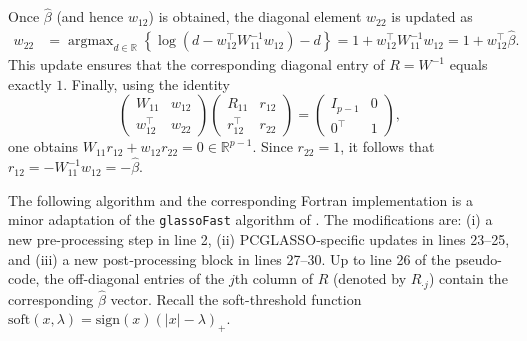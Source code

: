 \documentclass[12pt]{amsart}
\numberwithin{equation}{section}
\numberwithin{equation}{section}
\theoremstyle{plain}
\theoremstyle{definition}
\DeclareMathOperator*{\argmax}{\arg\max}
\newcommand{\R}{\mathbb{R}}
\newcommand{\sign}{\mathrm{sign}}
\begin{document}
Once $\hat{\beta}$ (and hence $w_{12}$) is obtained, the diagonal element $w_{22}$ is updated as 
\begin{align*}
w_{22} &= \argmax_{d\in\R}\left\{ \log(d-w_{12}^\top W_{11}^{-1} w_{12}) -d\right\}= 1+w_{12}^\top W_{11}^{-1}w_{12} = 1+w_{12}^\top\hat{\beta}.
\end{align*}
This update ensures that the corresponding diagonal entry of $R=W^{-1}$ equals exactly $1$. 
Finally, using the identity
\[
 \begin{pmatrix}
    W_{11} & w_{12} \\ w_{12}^\top & w_{22}
\end{pmatrix}  \begin{pmatrix}
    R_{11} & r_{12} \\ r_{12}^\top & r_{22}
\end{pmatrix} = \begin{pmatrix}
    I_{p-1} & 0 \\ 0^\top & 1
\end{pmatrix},
\]
one obtains $W_{11}r_{12}+w_{12} r_{22}=0\in\R^{p-1}$.
Since $r_{22}=1$, it follows that
$r_{12}=-W_{11}^{-1}w_{12}=-\hat{\beta}$. 

The following algorithm and the corresponding Fortran implementation is a minor adaptation of the \texttt{glassoFast} algorithm of \cite{glassoFAST}. The modifications are: (i) a new pre-processing step in line 2, (ii) PCGLASSO‑specific updates in lines 23–25, and (iii) a new post‑processing block in lines 27–30.
Up to line 26 of the pseudo-code, the off-diagonal entries of the $j$th column of $R$ (denoted by $R_{\cdot j}$) contain the corresponding $\hat{\beta}$ vector.
Recall the soft-threshold function 
$\mathrm{soft}(x,\lambda) = \sign(x)(|x|-\lambda)_+$.
\end{document}
